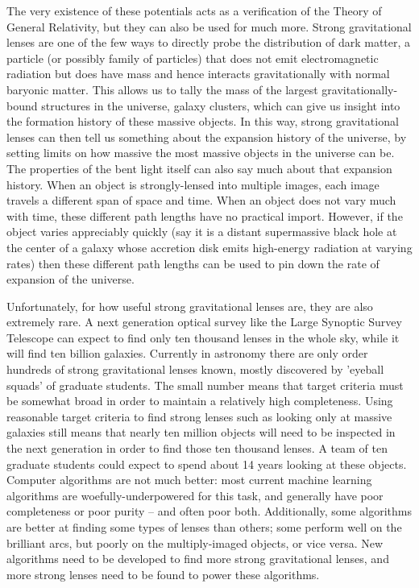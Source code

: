 \documentclass[10pt,twocolumn,letterpaper]{article}
\begin{document}
The very existence of these potentials acts as a verification of the Theory of
General Relativity, but they can also be used for much more. Strong
gravitational lenses are one of the few ways to directly probe the distribution
of dark matter, a particle (or possibly family of particles) that does not emit
electromagnetic radiation but does have mass and hence interacts
gravitationally with normal baryonic matter. This allows us to tally the mass
of the largest gravitationally-bound structures in the universe, galaxy
clusters, which can give us insight into the formation history of these massive
objects. In this way, strong gravitational lenses can then tell us something
about the expansion history of the universe, by setting limits on how massive
the most massive objects in the universe can be. The properties of the bent
light itself can also say much about that expansion history. When an object is
strongly-lensed into multiple images, each image travels a different span of
space and time. When an object does not vary much with time, these different
path lengths have no practical import. However, if the object varies
appreciably quickly (say it is a distant supermassive black hole at the center
of a galaxy whose accretion disk emits high-energy radiation at varying rates)
then these different path lengths can be used to pin down the rate of expansion
of the universe.

Unfortunately, for how useful strong gravitational lenses are, they are also
extremely rare. A next generation optical survey like the Large Synoptic Survey
Telescope can expect to find only ten thousand lenses in the whole sky, while
it will find ten billion galaxies. Currently in astronomy there are only order
hundreds of strong gravitational lenses known, mostly discovered by 'eyeball
squads' of graduate students. The small number means that target criteria must
be somewhat broad in order to maintain a relatively high completeness. Using
reasonable target criteria to find strong lenses such as looking only at
massive galaxies still means that nearly ten million objects will need to be
inspected in the next generation in order to find those ten thousand lenses. A
team of ten graduate students could expect to spend about 14 years looking at
these objects. Computer algorithms are not much better: most current machine
learning algorithms are woefully-underpowered for this task, and generally have
poor completeness or poor purity -- and often poor both. Additionally, some
algorithms are better at finding some types of lenses than others; some
perform well on the brilliant arcs, but poorly on the multiply-imaged objects,
or vice versa. New algorithms need to be developed to find more strong
gravitational lenses, and more strong lenses need to be found to power these
algorithms.
\end{document}
